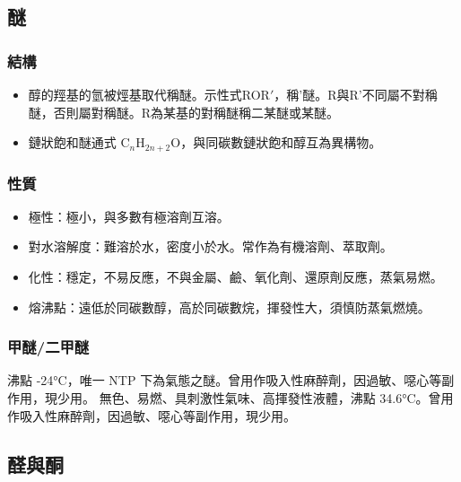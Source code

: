\documentclass[a4paper,12pt]{report}
\begin{document}
\begin{itemize}
\subsection{醚}
\subsubsection{結構}
\begin{itemize}
\item 醇的羥基的氫被烴基取代稱醚。示性式ROR$'$，稱\rmR\rmR'醚。R與R'不同屬不對稱醚，否則屬對稱醚。R為某基的對稱醚稱二某醚或某醚。
\item 鏈狀飽和醚通式 C$_n$H$_{2n+2}$O，與同碳數鏈狀飽和醇互為異構物。
\end{itemize}
\subsubsection{性質}
\begin{itemize}
\item 極性：極小，與多數有極溶劑互溶。
\item 對水溶解度：難溶於水，密度小於水。常作為有機溶劑、萃取劑。
\item 化性：穩定，不易反應，不與金屬、鹼、氧化劑、還原劑反應，蒸氣易燃。
\item 熔沸點：遠低於同碳數醇，高於同碳數烷，揮發性大，須慎防蒸氣燃燒。
\end{itemize}
\subsubsection{甲醚/二甲醚}
沸點 -24°C，唯一 NTP 下為氣態之醚。曾用作吸入性麻醉劑，因過敏、噁心等副作用，現少用。
無色、易燃、具刺激性氣味、高揮發性液體，沸點 34.6°C。曾用作吸入性麻醉劑，因過敏、噁心等副作用，現少用。
\subsection{醛與酮}

\end{itemize}
\end{document}
